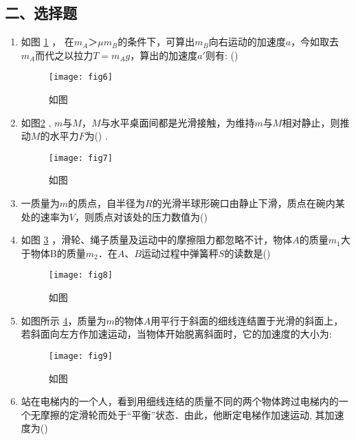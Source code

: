 \subsection*{二、选择题}
\begin{enumerate}
\item 如图 \ref{fig:6} ， 在$m_A＞μm_B$的条件下，可算出$m_B$向右运动的加速度$a$，今如取去$m_A$而代之以拉力$T=m_Ag$，算出的加速度$a′$则有: (\hspace{1pc})
    \begin{figure}[H]
        \centering
        \texttt{[image: fig6]}
        \caption{如图}\label{fig:6}
    \end{figure}
\item 如图\ref{fig:7} , $m$与$M$，$M$与水平桌面间都是光滑接触，为维持$m$与$M$相对静止，则推动$M$的水平力$F$为(\hspace{1pc})
.
    \begin{figure}[H]
        \centering
        \texttt{[image: fig7]}
        \caption{如图}\label{fig:7}
    \end{figure}
\item 一质量为$m$的质点，自半径为$R$的光滑半球形碗口由静止下滑，质点在碗内某处的速率为$V$，则质点对该处的压力数值为(\hspace{1pc})
\item 如图 \ref{fig:8} ，滑轮、绳子质量及运动中的摩擦阻力都忽略不计，物体$A$的质量$m_1$大于物体B的质量$m_2$．在$A$、$B$运动过程中弹簧秤$S$的读数是(\hspace{1pc})
    \begin{figure}[H]
        \centering
        \texttt{[image: fig8]}
        \caption{如图}\label{fig:8}
    \end{figure}

\item 如图所示 \ref{fig:9}，质量为$m$的物体$A$用平行于斜面的细线连结置于光滑的斜面上，若斜面向左方作加速运动，当物体开始脱离斜面时，它的加速度的大小为:
    \begin{figure}[H]
        \centering
        \texttt{[image: fig9]}
        \caption{如图}\label{fig:9}
    \end{figure}
\item 站在电梯内的一个人，看到用细线连结的质量不同的两个物体跨过电梯内的一个无摩擦的定滑轮而处于“平衡”状态．由此，他断定电梯作加速运动, 
其加速度为(\hspace{1pc})
\end{enumerate}


